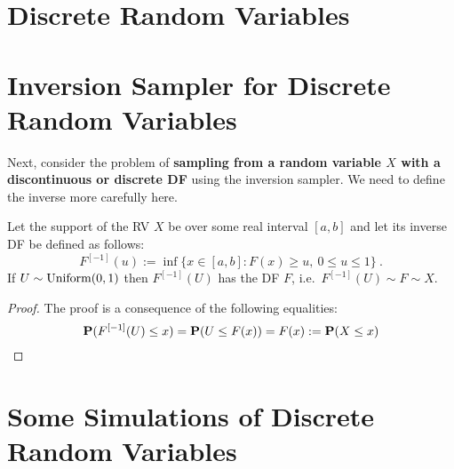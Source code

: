 \section{Discrete Random Variables}

\section{Inversion Sampler for Discrete Random Variables}\label{S:InvSDiscrete}
Next, consider the problem of {\bf sampling from a random variable $X$ with a discontinuous or discrete DF} using the inversion sampler.  We need to define the inverse more carefully here.
\begin{prop}
Let the support of the RV $X$ be over some real interval $[a,b]$ and let its inverse DF be defined as follows:
\[
F^{[-1]}(u) := \inf\{ x \in [a,b]: F(x) \geq u, \ 0 \leq u \leq 1 \} \ .
\]
If $U \sim \mbox{{\rm Uniform}}(0,1)$ then $F^{[-1]}(U)$ has the DF $F$, i.e.~$F^{[-1]}(U) \sim F \sim X$.
\end{prop}
\begin{proof}
The proof is a consequence of the following equalities:
\[
\mathbf{P}(F^{[-1]}(U) \leq x) = \mathbf{P}(U \leq F(x)) = F(x) := \mathbf{P}(X \leq x)
\]
\end{proof}

\section{Some Simulations of Discrete Random Variables}\label{S:InvSDiscreteRVs}

